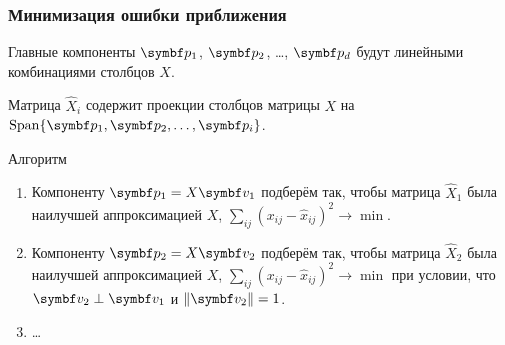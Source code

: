 \begin{frame}
  \frametitle{Минимизация ошибки приближения}


  Главные компоненты $\bp_1$, $\bp_2$, \ldots, $\bp_d$ будут линейными 
  комбинациями столбцов $X$. \pause

  Матрица $\hat X_i$ содержит проекции столбцов матрицы $X$ на $\Span\{ \bp_1, \bp_2, \ldots, \bp_i\}$.


  \begin{block}{Алгоритм}
    \begin{enumerate}
      \item Компоненту $\bp_1 = X \bv_1$ подберём так, чтобы 
      матрица $\hat X_1$ была наилучшей аппроксимацией $X$, $\sum_{ij} (x_{ij} - \hat{x}_{ij})^2 \to\min$. \pause

\item Компоненту $\bp_2 = X \bv_2$ подберём так, чтобы 
матрица $\hat X_2$ была наилучшей аппроксимацией $X$, $\sum_{ij} (x_{ij} - \hat{x}_{ij})^2 \to\min$
 при условии, что $\bv_2 \perp \bv_1$ и $\norm{\bv_2}=1$. \pause
      \item \ldots
    \end{enumerate}
    
  \end{block}
  

\end{frame}


